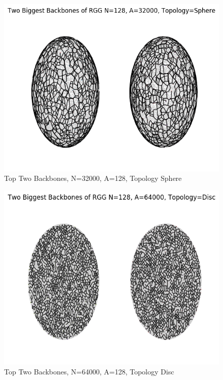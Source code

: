\documentclass{article}
\begin{document}
    \begin{figure}
      \centering
      \label{backbone_128_32000_Sphere}
      \includegraphics[width=1 \textwidth]{backbone/backbone_128_32000_Sphere.png}
      \caption{Top Two Backbones, N=32000, A=128, Topology Sphere}
    \end{figure}

    \begin{figure}
      \centering
      \label{backbone_128_64000_Disc}
      \includegraphics[width=1 \textwidth]{backbone/backbone_128_64000_Disc.png}
      \caption{Top Two Backbones, N=64000, A=128, Topology Disc}
    \end{figure}
\end{document}
